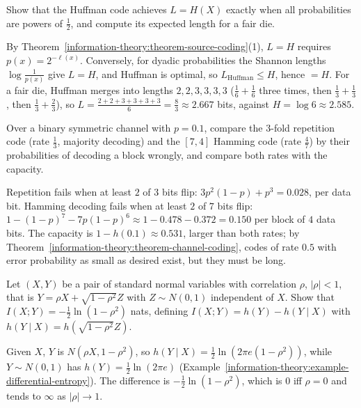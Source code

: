 \begin{exercise}\label{information-theory:exercise-huffman-dyadic}
Show that the Huffman code achieves $L = H(X)$ exactly when all probabilities are powers of $\frac12$, and compute its expected length for a fair die.
\end{exercise}

\begin{solution}
By Theorem~\ref{information-theory:theorem-source-coding}(1), $L = H$ requires $p(x) = 2^{-\ell(x)}$. Conversely, for dyadic probabilities the Shannon lengths $\log\frac1{p(x)}$ give $L = H$, and Huffman is optimal, so $L_{\mathrm{Huffman}} \leq H$, hence
$= H$. For a fair die, Huffman merges into lengths $2, 2, 3, 3, 3, 3$ ($\frac16 + \frac16$ three times, then $\frac13 + \frac13$, then $\frac13 + \frac23$), so $L = \frac{2 + 2 + 3 + 3 + 3 + 3}{6} = \frac83 \approx 2.667$ bits, against $H = \log 6 \approx 2.585$.
\end{solution}

\begin{exercise}\label{information-theory:exercise-bsc-repetition}
Over a binary symmetric channel with $p = 0.1$, compare the $3$-fold repetition code (rate $\frac13$, majority decoding) and the $[7, 4]$ Hamming code (rate $\frac47$) by their probabilities of decoding a block wrongly, and compare
both rates with the capacity.
\end{exercise}

\begin{solution}
Repetition fails when at least $2$ of $3$ bits flip: $3p^2(1 - p) + p^3 = 0.028$, per data bit. Hamming decoding fails when at least $2$ of $7$ bits flip: $1 - (1 - p)^7 - 7p(1 - p)^6 \approx 1 - 0.478 - 0.372 = 0.150$ per block of $4$ data
bits. The capacity is $1 - h(0.1) \approx 0.531$, larger than both rates; by Theorem~\ref{information-theory:theorem-channel-coding}, codes of rate $0.5$ with error probability as small as desired exist, but they must be long.
\end{solution}

\begin{exercise}\label{information-theory:exercise-mutual-information-gaussian}
Let $(X, Y)$ be a pair of standard normal variables with correlation $\rho$, $|\rho| < 1$, that is $Y = \rho X + \sqrt{1 - \rho^2}Z$ with $Z \sim N(0, 1)$ independent of $X$. Show that $I(X; Y) = -\frac12\ln(1 - \rho^2)$ nats, defining
$I(X; Y) = h(Y) - h(Y \mid X)$ with $h(Y \mid X) = h(\sqrt{1 - \rho^2}Z)$.
\end{exercise}

\begin{solution}
Given $X$, $Y$ is $N(\rho X, 1 - \rho^2)$, so $h(Y \mid X) = \frac12\ln(2\pi e(1 - \rho^2))$, while $Y \sim N(0, 1)$ has $h(Y) = \frac12\ln(2\pi e)$ (Example~\ref{information-theory:example-differential-entropy}). The difference is
$-\frac12\ln(1 - \rho^2)$, which is $0$ iff $\rho = 0$ and tends to $\infty$ as $|\rho| \to 1$.
\end{solution}
